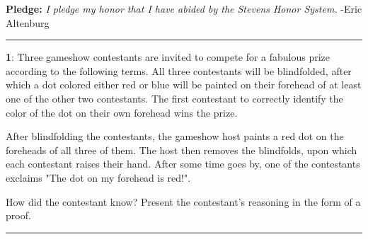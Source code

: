 \documentclass[11pt]{article}
\newcommand\question[2]{\vspace{.25in}\hrule\textbf{#1}: #2\vspace{.5em}\hrule\vspace{.10in}}
\begin{document}
\raggedright
\newcommand\NAME{Eric Altenburg}  %
\newcommand\COURSE{MA-240}
\newcommand\HWNUM{3}              %


\textbf{Pledge:} \textit{I pledge my honor that I have abided by the Stevens Honor System.} -Eric Altenburg

\question{1}{Three gameshow contestants are invited to compete for a fabulous prize according to the following terms. All three contestants will be blindfolded, after which a dot colored either red or blue will be painted on their forehead of at least one of the other two contestants. The first contestant to correctly identify the color of the dot on their own forehead wins the prize. 

After blindfolding the contestants, the gameshow host paints a red dot on the foreheads of all three of them. The host then removes the blindfolds, upon which each contestant raises their hand. After some time goes by, one of the contestants exclaims "The dot on my forehead is red!".

How did the contestant know? Present the contestant's reasoning in the form of a proof.}
\end{document}
